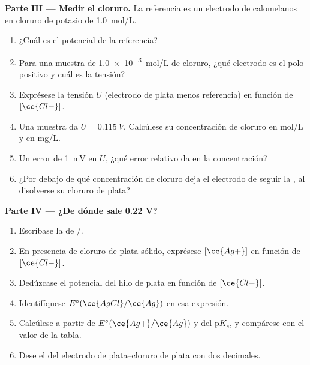 \begin{problem}
\medskip
\noindent\textbf{Parte III --- Medir el cloruro.}
La referencia es un electrodo de calomelanos en cloruro de potasio de
\qty{1.0}{mol/L}.
\begin{enumerate}[resume]
  \item ¿Cuál es el potencial de la referencia?
  \item Para una muestra de \qty{1.0e-3}{mol/L} de cloruro, ¿qué electrodo
        es el polo positivo y cuál es la tensión?
  \item Exprésese la tensión $U$ (electrodo de plata menos referencia) en
        función de $[\ce{Cl-}]$.
  \item Una muestra da $U = \qty{0.115}{V}$. Calcúlese su concentración de
        cloruro en \unit{mol/L} y en \unit{mg/L}.
  \item Un error de \qty{1}{mV} en $U$, ¿qué error relativo da en la
        concentración?
  \item ¿Por debajo de qué concentración de cloruro deja el electrodo de
        seguir la , al disolverse su cloruro de plata?
\end{enumerate}

\medskip
\noindent\textbf{Parte IV --- ¿De dónde sale 0.22 V?}
\begin{enumerate}[resume]
  \item Escríbase la  de /.
  \item En presencia de cloruro de plata sólido, exprésese $[\ce{Ag+}]$ en
        función de $[\ce{Cl-}]$.
  \item Dedúzcase el potencial del hilo de plata en función de
        $[\ce{Cl-}]$.
  \item Identifíquese $E^\circ(\ce{AgCl}/\ce{Ag})$ en esa expresión.
  \item Calcúlese a partir de $E^\circ(\ce{Ag+}/\ce{Ag})$ y del
        $\mathrm{p}K_s$, y compárese con el valor de la tabla.
  \item Dese el  del electrodo de plata--cloruro de plata
        con dos decimales.
\end{enumerate}
\end{problem}
